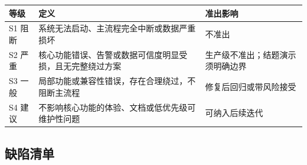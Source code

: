 \begin{longtable}[]{@{}
  >{\raggedright\arraybackslash}p{}
  >{\raggedright\arraybackslash}p{}
  >{\raggedright\arraybackslash}p{}@{}}
\toprule\noalign{}
\begin{minipage}[b]{\linewidth}\raggedright
等级
\end{minipage} & \begin{minipage}[b]{\linewidth}\raggedright
定义
\end{minipage} & \begin{minipage}[b]{\linewidth}\raggedright
准出影响
\end{minipage} \\
\midrule\noalign{}
\endhead
\bottomrule\noalign{}
\endlastfoot
S1 阻断 & 系统无法启动、主流程完全中断或数据严重损坏 & 不准出 \\
S2 严重 & 核心功能错误、告警或数据可信度明显受损，且无完整绕过方案 & 生产级不准出；结题演示须明确边界 \\
S3 一般 & 局部功能或兼容性错误，存在合理绕过，不阻断主流程 & 修复后回归或带风险接受 \\
S4 建议 & 不影响核心功能的体验、文档或低优先级可维护性问题 & 可纳入后续迭代 \\
\end{longtable}

\subsection{缺陷清单}\label{test-ux7f3aux9677ux6e05ux5355}

